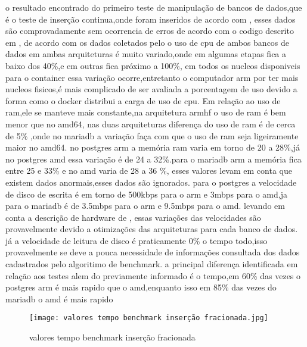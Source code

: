 \documentclass[
	12pt,				%
	openright,			%
	oneside,			%
	a4paper,			%
	english,			%
	french,				%
	spanish,			%
	brazil,				%
	]{abntex2}
\begin{document}


o resultado encontrado do primeiro teste de manipulação de bancos de dados,que é o teste de inserção continua,onde foram inseridos de acordo com ,
esses dados são comprovadamente sem ocorrencia de erros de acordo com o codigo descrito em ,
de acordo com os dados coletados pelo  o uso de cpu de ambos bancos de dados em ambas arquiteturas é muito variado,onde em algumas etapas fica a baixo dos 40\%,e em outras fica próximo a 100\%,
em todos os nucleos disponiveis para o container essa variação ocorre,entretanto o computador arm por ter mais nucleos fisicos,é mais complicado de ser avaliada a porcentagem de uso devido a forma como o docker distribui a carga de uso de cpu.
Em relação ao uso de ram,ele se manteve mais constante,na arquitetura armhf o uso de ram é bem menor que no amd64,
nas duas arquiteturas diferença do uso de ram é de cerca de 5\% ,onde no mariadb a variação faça com que o uso de ram seja ligeiramente maior no amd64.
no postgres arm a memória ram varia em torno de 20 a 28\%,já no postgres amd essa variação é de 24 a 32\%.para o mariadb arm a memória fica entre 25 e 33\% e no amd varia de 28 a 36 \%,
esses valores levam em conta que existem dados anormais,esses dados são ignorados.
para o postgres a velocidade de disco de escrita é em torno de 500kbps para o arm e 3mbps para o amd,ja para o mariadb é de 3.5mbps para o arm e 9.5mbps para o amd.
levando em conta a descrição de hardware de , essas variações das velocidades são provavelmente devido a otimizações das arquiteturas para cada banco de dados.
já a velocidade de leitura de disco é praticamente 0\% o tempo todo,isso provavelmente se deve a pouca necessidade de informações consultada dos dados cadastrados pelo algoritimo de benchmark.
a principal diferença identificada em relação aos testes alem do previamente informado é o tempo,em 60\% das vezes o postgres arm é mais rapido que o amd,enquanto isso em 85\% das vezes do mariadb o amd é mais rapido
\begin{figure}
  \texttt{[image: valores tempo benchmark inserção fracionada.jpg]}
  \caption{valores tempo benchmark inserção fracionada}
  \label{fig:resultados insercao fracionada}
\end{figure}
\end{document}
